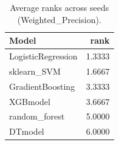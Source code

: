 \begin{table}[t]
\centering
\begin{tabular}{lr}
\toprule
Model & rank \\
\midrule
LogisticRegression & 1.3333 \\
sklearn_SVM & 1.6667 \\
GradientBoosting & 3.3333 \\
XGBmodel & 3.6667 \\
random_forest & 5.0000 \\
DTmodel & 6.0000 \\
\bottomrule
\end{tabular}
\caption{Average ranks across seeds (Weighted_Precision).}
\label{tab:avg_rank_Weighted_Precision}
\end{table}